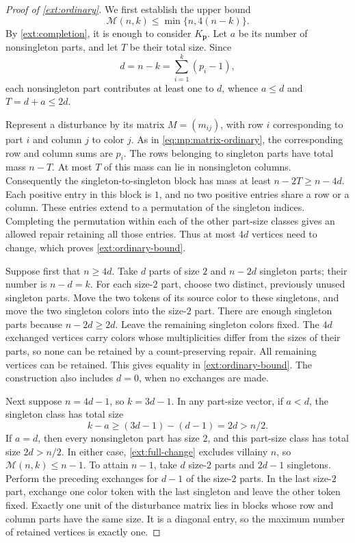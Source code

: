 \documentclass[11pt,reqno]{amsart}
\numberwithin{equation}{section}
\theoremstyle{definition}
\theoremstyle{remark}
\begin{document}
\begin{proof}[Proof of \cref{ext:ordinary}]
We first establish the upper bound
\begin{equation}
\label{ext:ordinary-bound}
 \mathcal M(n,k)\le\min\{n,4(n-k)\}.
\end{equation}
By \cref{ext:completion}, it is enough to consider
$K_{\mathbf p}$.  Let $a$ be its number of nonsingleton parts, and let
$T$ be their total size.  Since
\[
 d=n-k=\sum_{i=1}^k(p_i-1),
\]
each nonsingleton part contributes at least one to $d$, whence
$a\le d$ and $T=d+a\le2d$.

Represent a disturbance by its matrix $M=(m_{ij})$, with row $i$
corresponding to part $i$ and column $j$ to color $j$.  As in
\eqref{eq:mp:matrix-ordinary}, the corresponding row and column sums
are $p_i$.  The rows belonging to singleton parts have total mass
$n-T$.  At most $T$ of this mass can lie in nonsingleton columns.
Consequently the singleton-to-singleton block has mass at least
$n-2T\ge n-4d$.  Each positive entry in this block is $1$, and no two
positive entries share a row or a column.  These entries extend to a
permutation of the singleton indices.  Completing the permutation
within each of the other part-size classes gives an allowed repair
retaining all those entries.  Thus at most $4d$ vertices need to change,
which proves \eqref{ext:ordinary-bound}.

Suppose first that $n\ge4d$.  Take $d$ parts of size $2$ and $n-2d$
singleton parts; their number is $n-d=k$.  For each size-$2$ part,
choose two distinct, previously unused singleton parts.  Move the two
tokens of its source color to these singletons, and move the two
singleton colors into the size-$2$ part.  There are enough singleton
parts because $n-2d\ge2d$.  Leave the remaining singleton colors fixed.
The $4d$ exchanged vertices carry colors whose multiplicities differ
from the sizes of their parts, so none can be retained by a
count-preserving repair.  All remaining vertices can be retained.
This gives equality in \eqref{ext:ordinary-bound}.  The construction
also includes $d=0$, when no exchanges are made.

Next suppose $n=4d-1$, so $k=3d-1$.  In any part-size vector, if
$a<d$, the singleton class has total size
\[
 k-a\ge (3d-1)-(d-1)=2d>n/2.
\]
If $a=d$, then every nonsingleton part has size $2$, and this part-size
class has total size $2d>n/2$.  In either case,
\eqref{ext:full-change} excludes villainy $n$, so
$\mathcal M(n,k)\le n-1$.  To attain $n-1$, take $d$ size-$2$ parts
and $2d-1$ singletons.  Perform the preceding exchanges for $d-1$ of
the size-$2$ parts.  In the last size-$2$ part, exchange one color
token with the last singleton and leave the other token fixed.
Exactly one unit of the disturbance matrix lies in blocks whose row
and column parts have the same size.  It is a diagonal entry, so the
maximum number of retained vertices is exactly one.


\end{proof}
\end{document}
